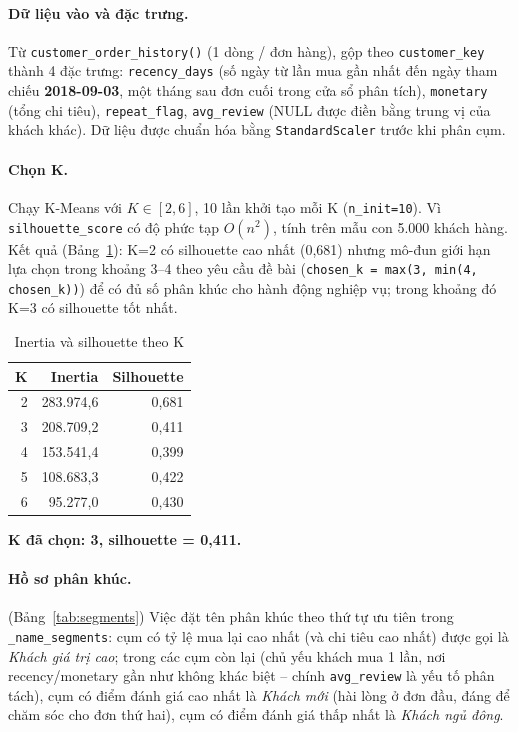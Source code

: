 \documentclass[12pt,a4paper]{article}
\newcommand{\code}[1]{\texttt{\small #1}}
\begin{document}
\paragraph{Dữ liệu vào và đặc trưng.} Từ \code{customer\_order\_history()} (1 dòng / đơn hàng), gộp theo
\code{customer\_key} thành 4 đặc trưng: \code{recency\_days} (số ngày từ lần mua gần nhất đến ngày tham chiếu
\textbf{2018-09-03}, một tháng sau đơn cuối trong cửa sổ phân tích), \code{monetary} (tổng chi tiêu),
\code{repeat\_flag}, \code{avg\_review} (NULL được điền bằng trung vị của khách khác). Dữ liệu được chuẩn hóa
bằng \code{StandardScaler} trước khi phân cụm.

\paragraph{Chọn K.} Chạy K-Means với \(K \in [2,6]\), 10 lần khởi tạo mỗi K (\code{n\_init=10}). Vì
\code{silhouette\_score} có độ phức tạp \(O(n^2)\), tính trên mẫu con 5.000 khách hàng. Kết quả (Bảng~\ref{tab:elbow}):
K=2 có silhouette cao nhất (0,681) nhưng mô-đun giới hạn lựa chọn trong khoảng 3--4 theo yêu cầu đề bài
(\code{chosen\_k = max(3, min(4, chosen\_k))}) để có đủ số phân khúc cho hành động nghiệp vụ; trong khoảng đó
K=3 có silhouette tốt nhất.

\begin{table}[h]
\centering
\caption{Inertia và silhouette theo K}\label{tab:elbow}
\small
\begin{tabular}{@{}r r r@{}}
\toprule
\textbf{K} & \textbf{Inertia} & \textbf{Silhouette}\\
\midrule
2 & 283.974,6 & 0,681\\
3 & 208.709,2 & 0,411\\
4 & 153.541,4 & 0,399\\
5 & 108.683,3 & 0,422\\
6 & 95.277,0 & 0,430\\
\bottomrule
\end{tabular}
\end{table}

\textbf{K đã chọn: 3, silhouette = 0,411.}

\paragraph{Hồ sơ phân khúc.} (Bảng~\ref{tab:segments}) Việc đặt tên phân khúc theo thứ tự ưu tiên trong
\code{\_name\_segments}: cụm có tỷ lệ mua lại cao nhất (và chi tiêu cao nhất) được gọi là \emph{Khách giá trị
cao}; trong các cụm còn lại (chủ yếu khách mua 1 lần, nơi recency/monetary gần như không khác biệt -- chính
\code{avg\_review} là yếu tố phân tách), cụm có điểm đánh giá cao nhất là \emph{Khách mới} (hài lòng ở đơn đầu,
đáng để chăm sóc cho đơn thứ hai), cụm có điểm đánh giá thấp nhất là \emph{Khách ngủ đông}.
\end{document}
